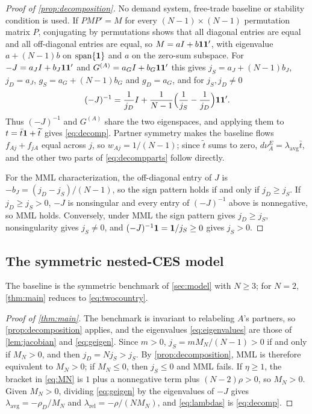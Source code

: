 \begin{proof}[Proof of \cref{prop:decomposition}]
No demand system, free-trade baseline or stability condition is used. If $PMP'=M$ for every $(N-1)\times(N-1)$ permutation matrix $P$, conjugating by permutations shows that all diagonal entries are equal and all off-diagonal entries are equal, so $M=aI+b\mathbf{1}\mathbf{1}'$, with eigenvalue $a+(N-1)b$ on $\operatorname{span}\{\mathbf{1}\}$ and $a$ on the zero-sum subspace. For $-J=a_JI+b_J\mathbf{1}\mathbf{1}'$ and $G^{(A)}=a_GI+b_G\mathbf{1}\mathbf{1}'$ this gives $j_S=a_J+(N-1)b_J$, $j_D=a_J$, $g_S=a_G+(N-1)b_G$ and $g_D=a_G$, and for $j_S,j_D\neq0$
\begin{equation*}
(-J)^{-1}=\frac{1}{j_D}I+\frac{1}{N-1}\Big(\frac{1}{j_S}-\frac{1}{j_D}\Big)\mathbf{1}\mathbf{1}'.
\end{equation*}
Thus $(-J)^{-1}$ and $G^{(A)}$ share the two eigenspaces, and applying them to $t=\bar t\mathbf{1}+\widetilde t$ gives \cref{eq:decomp}. Partner symmetry makes the baseline flows $f_{Aj}+f_{jA}$ equal across $j$, so $w_{Aj}=1/(N-1)$; since $\widetilde t$ sums to zero, $d\nu^E_A=\lambda_{\mathrm{avg}}\bar t$, and the other two parts of \cref{eq:decompparts} follow directly.

For the MML characterization, the off-diagonal entry of $J$ is $-b_J=(j_D-j_S)/(N-1)$, so the sign pattern holds if and only if $j_D\geq j_S$. If $j_D\geq j_S>0$, $-J$ is nonsingular and every entry of $(-J)^{-1}$ above is nonnegative, so MML holds. Conversely, under MML the sign pattern gives $j_D\geq j_S$, nonsingularity gives $j_S\neq0$, and $(-J)^{-1}\mathbf{1}=\mathbf{1}/j_S\geq0$ gives $j_S>0$.
\end{proof}

\subsection{The symmetric nested-CES model}

The baseline is the symmetric benchmark of \cref{sec:model} with $N\geq3$; for $N=2$, \cref{thm:main} reduces to \cref{eq:twocountry}.

\begin{proof}[Proof of \cref{thm:main}]
The benchmark is invariant to relabeling $A$'s partners, so \cref{prop:decomposition} applies, and the eigenvalues \cref{eq:eigenvalues} are those of \cref{lem:jacobian} and \cref{eq:geigen}. Since $m>0$, $j_S=mM_N/(N-1)>0$ if and only if $M_N>0$, and then $j_D=Nj_S>j_S$. By \cref{prop:decomposition}, MML is therefore equivalent to $M_N>0$; if $M_N\leq0$, then $j_S\leq0$ and MML fails. If $\eta\geq1$, the bracket in \cref{eq:MN} is $1$ plus a nonnegative term plus $(N-2)\rho>0$, so $M_N>0$. Given $M_N>0$, dividing \cref{eq:geigen} by the eigenvalues of $-J$ gives $\lambda_{\mathrm{avg}}=-\rho_D/M_N$ and $\lambda_{\mathrm{rel}}=-\rho/(NM_N)$, and \cref{eq:lambdas} is \cref{eq:decomp}.
\end{proof}

